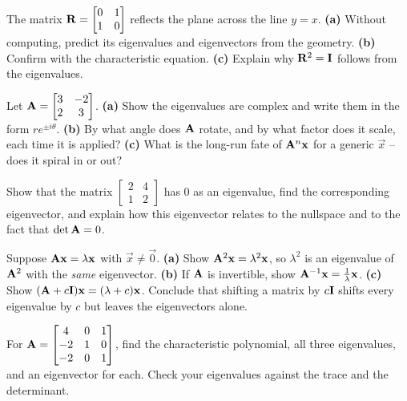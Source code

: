 \begin{exercise}
\label{ch23:ex-reflect}
The matrix $\mathbf{R}=\begin{bmatrix}0 & 1\\ 1 & 0\end{bmatrix}$ reflects the plane
across the line $y=x$. \textbf{(a)} Without computing, predict its eigenvalues and
eigenvectors from the geometry. \textbf{(b)} Confirm with the characteristic
equation. \textbf{(c)} Explain why $\mathbf{R}^2=\mathbf{I}$ follows from the eigenvalues.
\end{exercise}

\begin{exercise}
\label{ch23:ex-rot}
Let $\mathbf{A}=\begin{bmatrix}3 & -2\\ 2 & 3\end{bmatrix}$. \textbf{(a)} Show the
eigenvalues are complex and write them in the form $r e^{\pm i\theta}$. \textbf{(b)}
By what angle does $\mathbf{A}$ rotate, and by what factor does it scale, each time it
is applied? \textbf{(c)} What is the long-run fate of $\mathbf{A}^n\mathbf{x}$ for a
generic $\vec{x}$ -- does it spiral in or out?
\end{exercise}

\begin{exercise}[Singular means $\lambda=0$]
\label{ch23:ex-singular}
Show that the matrix $\begin{bmatrix}2 & 4\\ 1 & 2\end{bmatrix}$ has $0$ as an
eigenvalue, find the corresponding eigenvector, and explain how this eigenvector
relates to the nullspace and to the fact that $\det\mathbf{A}=0$.
\end{exercise}

\begin{exercise}
\label{ch23:ex-powers}
Suppose $\mathbf{A}\mathbf{x}=\lambda\mathbf{x}$ with $\vec{x}\neq\vec{0}$. \textbf{(a)} Show
$\mathbf{A}^2\mathbf{x}=\lambda^2\mathbf{x}$, so $\lambda^2$ is an eigenvalue of
$\mathbf{A}^2$ with the \emph{same} eigenvector. \textbf{(b)} If $\mathbf{A}$ is
invertible, show $\mathbf{A}^{-1}\mathbf{x}=\tfrac{1}{\lambda}\mathbf{x}$. \textbf{(c)}
Show $(\mathbf{A}+c\mathbf{I})\mathbf{x}=(\lambda+c)\mathbf{x}$. Conclude that shifting a matrix
by $c\mathbf{I}$ shifts every eigenvalue by $c$ but leaves the eigenvectors alone.
\end{exercise}

\begin{exercise}
\label{ch23:ex-3full}
For $\mathbf{A}=\begin{bmatrix}4 & 0 & 1\\ -2 & 1 & 0\\ -2 & 0 & 1\end{bmatrix}$,
find the characteristic polynomial, all three eigenvalues, and an eigenvector for
each. Check your eigenvalues against the trace and the determinant.
\end{exercise}

